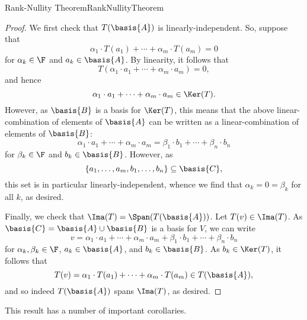 \begin{thm}{Rank-Nullity Theorem}{RankNullityTheorem}
\begin{proof}
		We first check that $T(\basis{A})$ is linearly-independent.  So, suppose that
		\begin{equation}
			\alpha _1\cdot T(a_1)+\cdots +\alpha _m\cdot T(a_m)=0
		\end{equation}
		for $\alpha _k\in \F$ and $a_k\in \basis{A}$.  By linearity, it follows that
		\begin{equation}
			T(\alpha _1\cdot a_1+\cdots +\alpha _m\cdot a_m)=0,
		\end{equation}
		and hence
		\begin{equation}
			\alpha _1\cdot a_1+\cdots +\alpha _m\cdot a_m\in \Ker (T).
		\end{equation}
		However, as $\basis{B}$ is a basis for $\Ker (T)$, this means that the above linear-combination of elements of $\basis{A}$ can be written as a linear-combination of elements of $\basis{B}$:
		\begin{equation}
			\alpha _1\cdot a_1+\cdots +\alpha _m\cdot a_m=\beta _1\cdot b_1+\cdots +\beta _n\cdot b_n
		\end{equation}
		for $\beta _k\in \F$ and $b_k\in \basis{B}$.  However, as
		\begin{equation}
			\{ a_1,\ldots ,a_m,b_1,\ldots ,b_n\} \subseteq \basis{C},
		\end{equation}
		this set is in particular linearly-independent, whence we find that $\alpha _k=0=\beta _k$ for all $k$, as desired.
		
		Finally, we check that $\Ima (T)=\Span (T(\basis{A}))$.  Let $T(v)\in \Ima (T)$.  As $\basis{C}=\basis{A}\cup \basis{B}$ is a basis for $V$, we can write
		\begin{equation}
			v=\alpha _1\cdot a_1+\cdots +\alpha _m\cdot a_m+\beta _1\cdot b_1+\cdots +\beta _n\cdot b_n
		\end{equation}
		for $\alpha _k,\beta _k\in \F$, $a_k\in \basis{A}$, and $b_k\in \basis{B}$.  As $b_k\in \Ker (T)$, it follows that
		\begin{equation}
			T(v)=\alpha _1\cdot T(a_1)+\cdots +\alpha _m\cdot T(a_m)\in T(\basis{A}),
		\end{equation}
		and so indeed $T(\basis{A})$ spans $\Ima (T)$, as desired.
	\end{proof}
\end{thm}
This result has a number of important corollaries.
